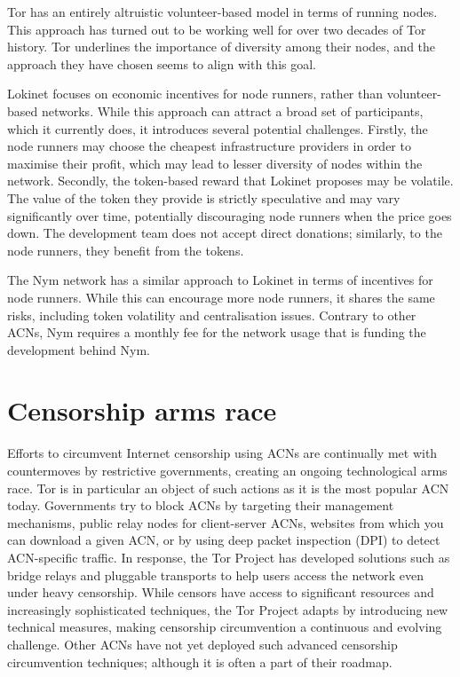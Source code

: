 Tor has an entirely altruistic volunteer-based model in terms of running nodes. This approach has turned out to be working well for over two decades of Tor history. Tor underlines the importance of diversity among their nodes, and the approach they have chosen seems to align with this goal.

Lokinet focuses on economic incentives for node runners, rather than volunteer-based networks. While this approach can attract a broad set of participants, which it currently does, it introduces several potential challenges. Firstly, the node runners may choose the cheapest infrastructure providers in order to maximise their profit, which may lead to lesser diversity of nodes within the network. Secondly, the token-based reward that Lokinet proposes may be volatile. The value of the token they provide is strictly speculative and may vary significantly over time, potentially discouraging node runners when the price goes down. The development team does not accept direct donations; similarly, to the node runners, they benefit from the tokens.

The Nym network has a similar approach to Lokinet in terms of incentives for node runners. While this can encourage more node runners, it shares the same risks, including token volatility and centralisation issues. Contrary to other ACNs, Nym requires a monthly fee for the network usage that is funding the development behind Nym.

\section{Censorship arms race}
Efforts to circumvent Internet censorship using ACNs are continually met with countermoves by restrictive governments, creating an ongoing technological arms race. Tor is in particular an object of such actions \cite{tor-arms-race} as it is the most popular ACN today. Governments try to block ACNs by targeting their management mechanisms, public relay nodes for client-server ACNs, websites from which you can download a given ACN, or by using deep packet inspection (DPI) to detect ACN-specific traffic. In response, the Tor Project has developed solutions such as bridge relays and pluggable transports to help users access the network even under heavy censorship. While censors have access to significant resources and increasingly sophisticated techniques, the Tor Project adapts by introducing new technical measures, making censorship circumvention a continuous and evolving challenge. Other ACNs have not yet deployed such advanced censorship circumvention techniques; although it is often a part of their roadmap.

